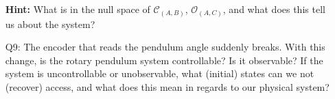 \documentclass[12pt]{report}
\newcommand\drew[1]{\textcolor{red}{#1}}
\begin{document}
\begin{enumerate}[Question]
          \textbf{Hint:} What is in the null space of $\mathcal{C}_{(A,B)}$, $\mathcal{O}_{(A,C)}$, and what does this tell us about the system?\\
    \item[Q9:] The encoder that reads the pendulum angle suddenly breaks. With this change, is the rotary pendulum system controllable? Is it observable? If the system is uncontrollable or unobservable, what (initial) states can we not (recover) access, and what does this mean in regards to our physical system?\\

\end{enumerate}
\end{document}
